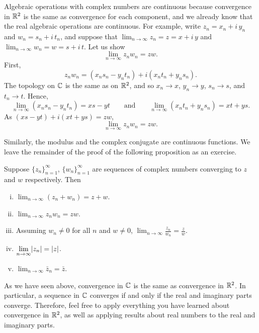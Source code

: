 Algebraic operations with complex numbers are
continuous because convergence in 
${\mathbb{R}}^2$ is the same as convergence for each component, and we already know
that the real algebraic operations are continuous.  For example,
write $z_n = x_n + i\,y_n$ and
$w_n = s_n + i\,t_n$, and suppose that
$\lim_{n\to\infty} z_n = z = x+i\,y$ and $\lim_{n\to\infty} w_n = w = s+i\,t$.
Let us show
\begin{equation*}
\lim_{n\to\infty} z_n w_n = zw .
\end{equation*}
First,
\begin{equation*}
z_n w_n = (x_ns_n-y_nt_n) + i(x_nt_n+y_ns_n) .
\end{equation*}
The topology on ${\mathbb{C}}$ is the same as on ${\mathbb{R}}^2$, and so
$x_n \to x$, $y_n \to y$, $s_n \to s$, and $t_n \to t$.
Hence,
\begin{equation*}
\lim_{n\to\infty} (x_ns_n-y_nt_n) = xs-yt \qquad \text{and} \qquad
\lim_{n\to\infty} (x_nt_n+y_ns_n) = xt+ys .
\end{equation*}
As
$(xs-yt)+i(xt+ys) = zw$,
\begin{equation*}
\lim_{n\to\infty} z_n w_n = zw .
\end{equation*}

Similarly, the modulus and the complex conjugate are continuous functions.  We
leave the remainder of the proof of the following proposition as an exercise.

\begin{prop} \label{prop:continuityofcomplex}
Suppose $\{ z_n \}_{n=1}^\infty$, $\{ w_n \}_{n=1}^\infty$ are sequences of complex numbers converging
to $z$ and $w$ respectively.  Then
\begin{enumerate}[(i)]
\item
$\displaystyle \lim_{n\to \infty} (z_n + w_n) = z + w$.
\item
$\displaystyle \lim_{n\to \infty} z_n w_n = z w$.
\item
Assuming $w_n \neq 0$ for all $n$ and $w \neq 0$,
$\displaystyle \lim_{n\to \infty} \frac{z_n}{w_n} = \frac{z}{w}$.
\item
$\displaystyle \lim_{n\to \infty} \lvert {z_n} \rvert = \lvert {z} \rvert$.
\item
$\displaystyle \lim_{n\to \infty} \bar{z}_n = \bar{z}$.
\end{enumerate}
\end{prop}

As we have seen above, convergence in ${\mathbb{C}}$ is the same as convergence in
${\mathbb{R}}^2$.  In particular, a sequence in ${\mathbb{C}}$ converges if and only if
the real and imaginary parts converge.  Therefore, feel free to apply
everything you have learned about convergence in ${\mathbb{R}}^2$, as well as
applying results about real numbers to the real and imaginary parts.

